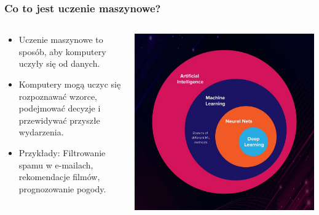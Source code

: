 \documentclass[smaller]{beamer}
\begin{document}
\begin{frame}
\frametitle{Co to jest uczenie maszynowe?}

\begin{columns}
    \begin{column}{0.6\textwidth}
        \begin{itemize}
            \item Uczenie maszynowe to sposób, aby komputery uczyły się od danych.
            \item Komputery mogą uczyc się rozpoznawać wzorce, podejmować decyzje i przewidywać przyszłe wydarzenia.
            \item Przykłady: Filtrowanie spamu w e-mailach, rekomendacje filmów, prognozowanie pogody.
        \end{itemize}
    \end{column}

    \begin{column}{0.4\textwidth}
        \includegraphics[width=\textwidth]{../manifest/ml-dl.jpg}
    \end{column}
\end{columns}
\end{frame}

\end{document}
